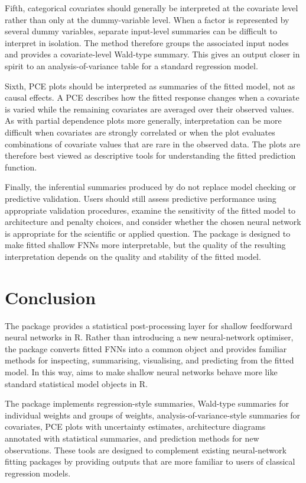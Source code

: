 Fifth, categorical covariates should generally be interpreted at the covariate level rather than only at the dummy-variable level.
When a factor is represented by several dummy variables, separate input-level summaries can be difficult to interpret in isolation.
The  method therefore groups the associated input nodes and provides a covariate-level Wald-type summary.
This gives an output closer in spirit to an analysis-of-variance table for a standard regression model.

Sixth, PCE plots should be interpreted as summaries of the fitted model, not as causal effects.
A PCE describes how the fitted response changes when a covariate is varied while the remaining covariates are averaged over their observed values.
As with partial dependence plots more generally, interpretation can be more difficult when covariates are strongly correlated or when the plot evaluates combinations of covariate values that are rare in the observed data.
The plots are therefore best viewed as descriptive tools for understanding the fitted prediction function.

Finally, the inferential summaries produced by  do not replace model checking or predictive validation.
Users should still assess predictive performance using appropriate validation procedures, examine the sensitivity of the fitted model to architecture and penalty choices, and consider whether the chosen neural network is appropriate for the scientific or applied question.
The package is designed to make fitted shallow FNNs more interpretable, but the quality of the resulting interpretation depends on the quality and stability of the fitted model.

\section{Conclusion}\label{sec:conclusion}

The  package provides a statistical post-processing layer for shallow feedforward neural networks in R.
Rather than introducing a new neural-network optimiser, the package converts fitted FNNs into a common  object and provides familiar methods for inspecting, summarising, visualising, and predicting from the fitted model.
In this way,  aims to make shallow neural networks behave more like standard statistical model objects in R.

The package implements regression-style summaries, Wald-type summaries for individual weights and groups of weights, analysis-of-variance-style summaries for covariates, PCE plots with uncertainty estimates, architecture diagrams annotated with statistical summaries, and prediction methods for new observations.
These tools are designed to complement existing neural-network fitting packages by providing outputs that are more familiar to users of classical regression models.

